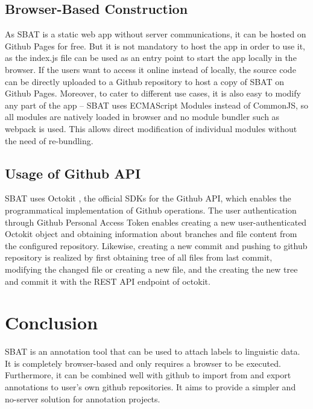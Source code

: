 \documentclass[a4paper]{article}
\begin{document}
\subsection{Browser-Based Construction}
As SBAT is a static web app without server communications, it can be hosted on Github Pages for free. But it is not mandatory to host the app in order to use it, as the index.js file can be used as an entry point to start the app locally in the browser. If the users want to access it online instead of locally, the source code can be directly uploaded to a Github repository to host a copy of SBAT on Github Pages. Moreover, to cater to different use cases, it is also easy to modify any part of the app -- SBAT uses ECMAScript Modules instead of CommonJS, so all modules are natively loaded in browser and no module bundler such as webpack is used. This allows direct modification of individual modules without the need of re-bundling.
\subsection{Usage of Github API}
SBAT uses Octokit \cite{octokit.js}, the official SDKs for the Github API, which enables the programmatical implementation of Github operations. The user authentication through Github Personal Access Token enables creating a new user-authenticated Octokit object and obtaining information about branches and file content from the configured repository. Likewise, creating a new commit and pushing to github repository is realized by first obtaining tree of all files from last commit, modifying the changed file or creating a new file, and the creating the new tree and commit it with the REST API endpoint of octokit.

\section{Conclusion}
SBAT is an annotation tool that can be used to attach labels to linguistic data. It is completely browser-based and only requires a browser to be executed. Furthermore, it can be combined well with github to import from and export annotations to user's own github repositories. It aims to provide a simpler and no-server solution for annotation projects.\\ 












\end{document}
